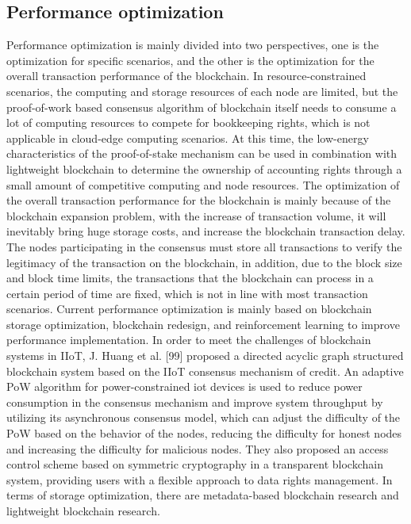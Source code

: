 \documentclass[lettersize,journal]{IEEEtran}
\begin{document}
\subsection{Performance optimization}
Performance optimization is mainly divided into two perspectives, one is the optimization for specific scenarios, and the other is the optimization for the overall transaction performance of the blockchain. In resource-constrained scenarios, the computing and storage resources of each node are limited, but the proof-of-work based consensus algorithm of blockchain itself needs to consume a lot of computing resources to compete for bookkeeping rights, which is not applicable in cloud-edge computing scenarios. At this time, the low-energy characteristics of the proof-of-stake mechanism can be used in combination with lightweight blockchain to determine the ownership of accounting rights through a small amount of competitive computing and node resources. The optimization of the overall transaction performance for the blockchain is mainly because of the blockchain expansion problem, with the increase of transaction volume, it will inevitably bring huge storage costs, and increase the blockchain transaction delay. The nodes participating in the consensus must store all transactions to verify the legitimacy of the transaction on the blockchain, in addition, due to the block size and block time limits, the transactions that the blockchain can process in a certain period of time are fixed, which is not in line with most transaction scenarios. 
Current performance optimization is mainly based on blockchain storage optimization, blockchain redesign, and reinforcement learning to improve performance implementation. In order to meet the challenges of blockchain systems in IIoT, J. Huang et al. [99] proposed a directed acyclic graph structured blockchain system based on the IIoT consensus mechanism of credit. An adaptive PoW algorithm for power-constrained iot devices is used to reduce power consumption in the consensus mechanism and improve system throughput by utilizing its asynchronous consensus model, which can adjust the difficulty of the PoW based on the behavior of the nodes, reducing the difficulty for honest nodes and increasing the difficulty for malicious nodes. They also proposed an access control scheme based on symmetric cryptography in a transparent blockchain system, providing users with a flexible approach to data rights management. In terms of storage optimization, there are metadata-based blockchain research and lightweight blockchain research.
\end{document}
